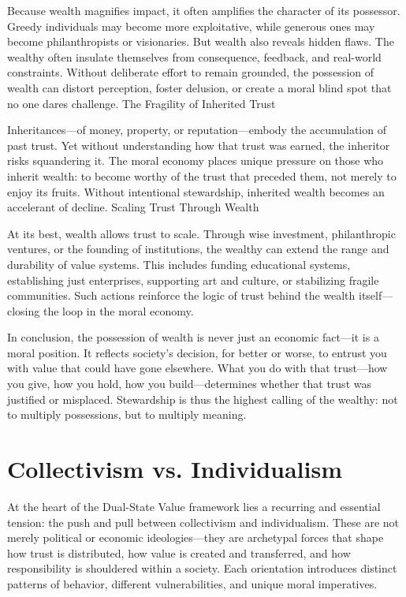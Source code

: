 \documentclass[11pt,oneside]{book}
\begin{document}
Because wealth magnifies impact, it often amplifies the character of its possessor. Greedy individuals may become more exploitative, while generous ones may become philanthropists or visionaries. But wealth also reveals hidden flaws. The wealthy often insulate themselves from consequence, feedback, and real-world constraints. Without deliberate effort to remain grounded, the possession of wealth can distort perception, foster delusion, or create a moral blind spot that no one dares challenge.
The Fragility of Inherited Trust

Inheritances—of money, property, or reputation—embody the accumulation of past trust. Yet without understanding how that trust was earned, the inheritor risks squandering it. The moral economy places unique pressure on those who inherit wealth: to become worthy of the trust that preceded them, not merely to enjoy its fruits. Without intentional stewardship, inherited wealth becomes an accelerant of decline.
Scaling Trust Through Wealth

At its best, wealth allows trust to scale. Through wise investment, philanthropic ventures, or the founding of institutions, the wealthy can extend the range and durability of value systems. This includes funding educational systems, establishing just enterprises, supporting art and culture, or stabilizing fragile communities. Such actions reinforce the logic of trust behind the wealth itself—closing the loop in the moral economy.

In conclusion, the possession of wealth is never just an economic fact—it is a moral position. It reflects society’s decision, for better or worse, to entrust you with value that could have gone elsewhere. What you do with that trust—how you give, how you hold, how you build—determines whether that trust was justified or misplaced. Stewardship is thus the highest calling of the wealthy: not to multiply possessions, but to multiply meaning.


\chapter{Collectivism vs. Individualism}

At the heart of the Dual-State Value framework lies a recurring and essential tension: the push and pull between collectivism and individualism. These are not merely political or economic ideologies—they are archetypal forces that shape how trust is distributed, how value is created and transferred, and how responsibility is shouldered within a society. Each orientation introduces distinct patterns of behavior, different vulnerabilities, and unique moral imperatives.
\end{document}
